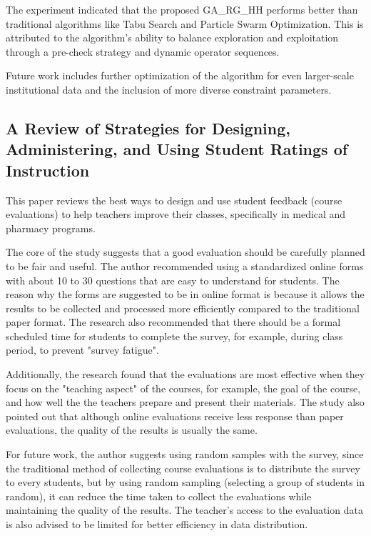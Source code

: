 The experiment indicated that the proposed GA\_RG\_HH performs better than traditional algorithms like Tabu Search and Particle Swarm Optimization. This is attributed to the algorithm's ability to balance exploration and exploitation through a pre-check strategy and dynamic operator sequences.

Future work includes further optimization of the algorithm for even larger-scale institutional data and the inclusion of more diverse constraint parameters.


\subsection{A Review of Strategies for Designing, Administering, and Using Student Ratings of Instruction \cite{paper_14}}

This paper reviews the best ways to design and use student feedback (course evaluations) to help teachers improve their classes, specifically in medical and pharmacy programs.

The core of the study suggests that a good evaluation should be carefully planned to be fair and useful. The author recommended using a standardized online forms with about 10 to 30 questions that are easy to understand for students. The reason why the forms are suggested to be in online format is because it allows the results to be collected and processed more efficiently compared to the traditional paper format. The research also recommended that there should be a formal scheduled time for students to complete the survey, for example, during class period, to prevent "survey fatigue".

Additionally, the research found that the evaluations are most effective when they focus on the "teaching aspect" of the courses, for example, the goal of the course, and how well the the teachers prepare and present their materials. The study also pointed out that although online evaluations receive less response than paper evaluations, the quality of the results is usually the same.

For future work, the author suggests using random samples with the survey, since the traditional method of collecting course evaluations is to distribute the survey to every students, but by using random sampling (selecting a group of students in random), it can reduce the time taken to collect the evaluations while maintaining the quality of the results. The teacher's access to the evaluation data is also advised to be limited for better efficiency in data distribution. 

